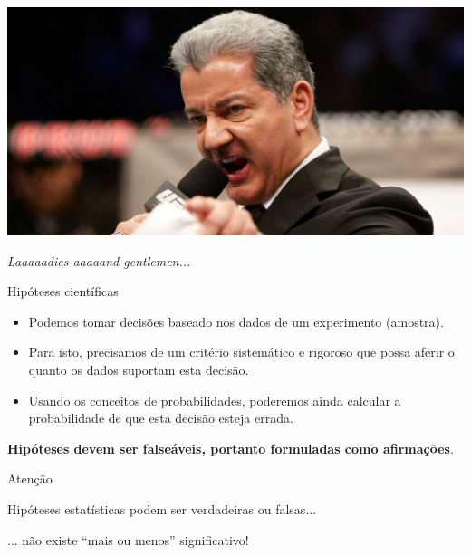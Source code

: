 \documentclass{beamer}
\begin{document}
\begin{frame}{\scriptsize }
  \begin{center}
    \includegraphics[width=.9\textwidth]{Cap10-11/its-time}

    \vfill
    {\footnotesize \em Laaaaadies aaaaand gentlemen...}
  \end{center}
\end{frame}

\begin{frame}{\scriptsize Hipóteses científicas}
  \begin{itemize}
    \footnotesize
  \item Podemos tomar decisões baseado nos dados de um experimento
    (amostra).
    \medskip
  \item Para isto, precisamos de um critério sistemático e rigoroso
    que possa aferir o quanto os dados suportam esta decisão.
    \medskip
  \item Usando os conceitos de probabilidades, poderemos ainda
    calcular a probabilidade de que esta decisão esteja errada.
  \end{itemize}
  \begin{block}{}
    \scriptsize
    {\bf Hipóteses devem ser falseáveis, portanto formuladas como afirmações}.
  \end{block}
\end{frame}

\begin{frame}{\scriptsize Atenção}
  \begin{center}
    Hipóteses estatísticas podem ser verdadeiras ou falsas...

    \bigskip
    ... não existe ``mais ou menos'' significativo!
  \end{center}
\end{frame}
\end{document}
